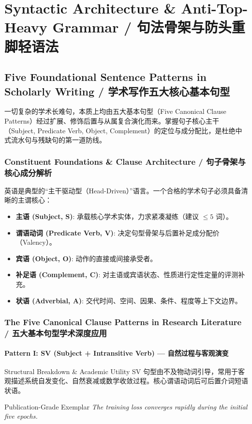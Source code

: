\part{Syntactic Architecture \& Anti-Top-Heavy Grammar / 句法骨架与防头重脚轻语法}\label{part:syntax}

\chapter{Five Foundational Sentence Patterns in Scholarly Writing / 学术写作五大核心基本句型}\label{ch:patterns}
一切复杂的学术长难句，本质上均由五大基本句型（Five Canonical Clause Patterns）经过扩展、修饰后置与从属复合演化而来。掌握句子核心主干（Subject, Predicate Verb, Object, Complement）的定位与成分配比，是杜绝中式流水句与残缺句的第一道防线。

\section{Constituent Foundations \& Clause Architecture / 句子骨架与核心成分解析}
英语是典型的“主干驱动型（Head-Driven）”语言。一个合格的学术句子必须具备清晰的主谓核心：
\begin{itemize}[leftmargin=1.5em]
  \item \textbf{主语 (Subject, S)}: 承载核心学术实体，力求紧凑凝练（建议 $\le 5$ 词）。
  \item \textbf{谓语动词 (Predicate Verb, V)}: 决定句型骨架与后置补足成分配价（Valency）。
  \item \textbf{宾语 (Object, O)}: 动作的直接或间接承受者。
  \item \textbf{补足语 (Complement, C)}: 对主语或宾语状态、性质进行定性定量的评测补充。
  \item \textbf{状语 (Adverbial, A)}: 交代时间、空间、因果、条件、程度等上下文边界。
\end{itemize}

\section{The Five Canonical Clause Patterns in Research Literature / 五大基本句型学术深度应用}
\subsection{Pattern I: SV (Subject + Intransitive Verb) --- 自然过程与客观演变}
\begin{ConceptBox}{Structural Breakdown \& Academic Utility}
SV 句型由不及物动词引导，常用于客观描述系统自发变化、自然衰减或数学收敛过程。核心谓语动词后可后置介词短语状语。
\end{ConceptBox}
\begin{ExampleBox}{Publication-Grade Exemplar}
\textit{The training loss converges rapidly during the initial five epochs.}
\end{ExampleBox}
\vspace{4pt}
